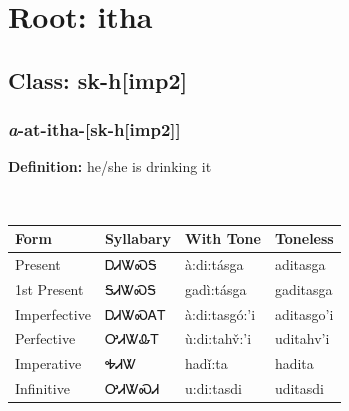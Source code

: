 \needspace{4in}
\section*{Root: itha}
\nopagebreak
{}
\needspace{3in}
\subsection*{Class: sk-h[imp2]}
\nopagebreak
\needspace{2in}
\subsubsection*{\textit{a}{-}at{-}\textbf{itha}{-}[sk-h[imp2]]}
\nopagebreak
\textbf{Definition: } he/she is drinking it
\\[0.5em]
\begin{tabularx}{\textwidth}{l X X X}%
\toprule%
\textbf{Form}&\textbf{Syllabary}&\textbf{With Tone}&\textbf{Toneless}\\%
\midrule%
Present&ᎠᏗᏔᏍᎦ&à:di:tásga&aditasga\\%
1st Present&ᎦᏗᏔᏍᎦ&gadì:tásga&gaditasga\\%
Imperfective&ᎠᏗᏔᏍᎪᎢ&à:di:tasgó:’i&aditasgo’i\\%
Perfective&ᎤᏗᏔᎲᎢ&ù:di:tahv̌:’i&uditahv’i\\%
Imperative&ᎭᏗᏔ&hadǐ:ta&hadita\\%
Infinitive&ᎤᏗᏔᏍᏗ&u:di:tasdi&uditasdi\\%
\bottomrule%
\end{tabularx}
\\[1em]